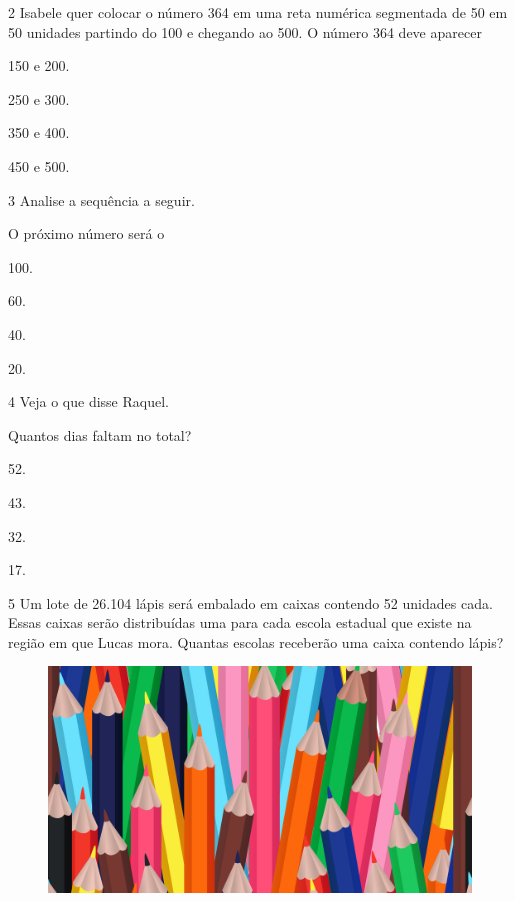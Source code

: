 \num{2} Isabele quer colocar o número 364 em uma reta numérica segmentada de 50 em 50 unidades partindo do 100 e chegando ao 500. O número 364 deve aparecer

\begin{multicols}{2}
\begin{escolha}
\item
  150 e 200.
\item
  250 e 300.
\item
  350 e 400.
\item
  450 e 500.
\end{escolha}
\end{multicols}

\num{3} Analise a sequência a seguir.

\enlargethispage{4\baselineskip}

O próximo número será o

\begin{multicols}{4}
\begin{escolha}
\item
  100.
\item
  60.
\item
  40.
\item
  20.
\end{escolha}
\end{multicols}

\pagebreak
\num{4} Veja o que disse Raquel.


Quantos dias faltam no total?

\begin{multicols}{2}
\begin{escolha}
\item
  52.
\item
  43.
\item
  32.
\item
  17.
\end{escolha}
\end{multicols}

\num{5} Um lote de 26.104 lápis será embalado em caixas contendo 52 unidades cada. Essas caixas serão distribuídas uma para cada escola
estadual que existe na região em que Lucas mora. Quantas escolas
receberão uma caixa contendo lápis?

\begin{figure}[htpb!]
\centering
\includegraphics[width=.9\textwidth]{media/image80a.jpeg}
\end{figure}

